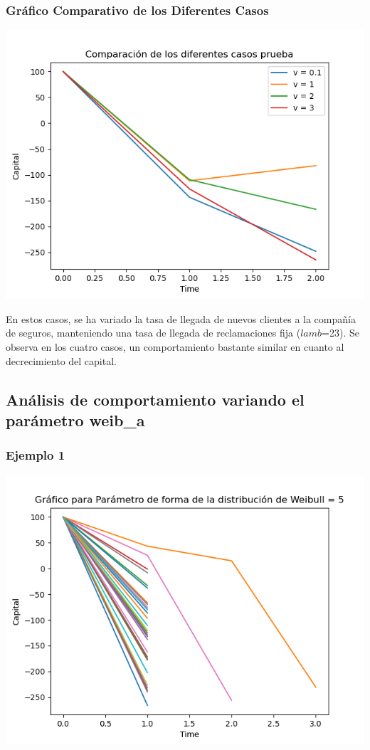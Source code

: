 \documentclass{article}
\begin{document}
 \subsubsection{Gráfico Comparativo de los Diferentes Casos}
\includegraphics[scale = 0.8]{vcomp.png}

En estos casos, se ha variado la tasa de llegada de nuevos clientes a la compañía de seguros, manteniendo una tasa de llegada de reclamaciones fija ($lamb$=23). Se observa en los cuatro casos, un comportamiento bastante similar en cuanto al decrecimiento del capital. 

\subsection{Análisis de comportamiento variando el parámetro weib\_a}

\subsubsection{Ejemplo 1}
\includegraphics[scale = 0.8]{weib1.png}
\end{document}
